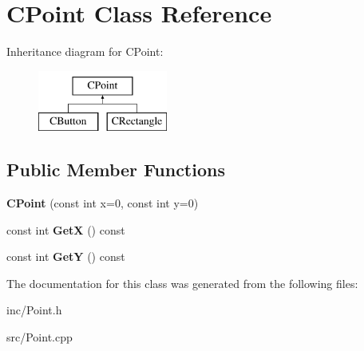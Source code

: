 \hypertarget{classCPoint}{\section{C\-Point Class Reference}
\label{classCPoint}
}
Inheritance diagram for C\-Point\-:\begin{figure}[H]
\begin{center}
\leavevmode
\includegraphics[height=2.000000cm]{classCPoint}
\end{center}
\end{figure}
\subsection*{Public Member Functions}
\begin{DoxyCompactItemize}
\item 
\hypertarget{classCPoint_ab11c86a3b00c3581d58a1c221256e112}{{\bfseries C\-Point} (const int x=0, const int y=0)}\label{classCPoint_ab11c86a3b00c3581d58a1c221256e112}

\item 
\hypertarget{classCPoint_a9307591d1d373653beeab949ff0f1ce6}{const int {\bfseries Get\-X} () const }\label{classCPoint_a9307591d1d373653beeab949ff0f1ce6}

\item 
\hypertarget{classCPoint_a6277e4683bbec2584925a24bcb2ad64f}{const int {\bfseries Get\-Y} () const }\label{classCPoint_a6277e4683bbec2584925a24bcb2ad64f}

\end{DoxyCompactItemize}


The documentation for this class was generated from the following files\-:\begin{DoxyCompactItemize}
\item 
inc/Point.\-h\item 
src/Point.\-cpp\end{DoxyCompactItemize}
